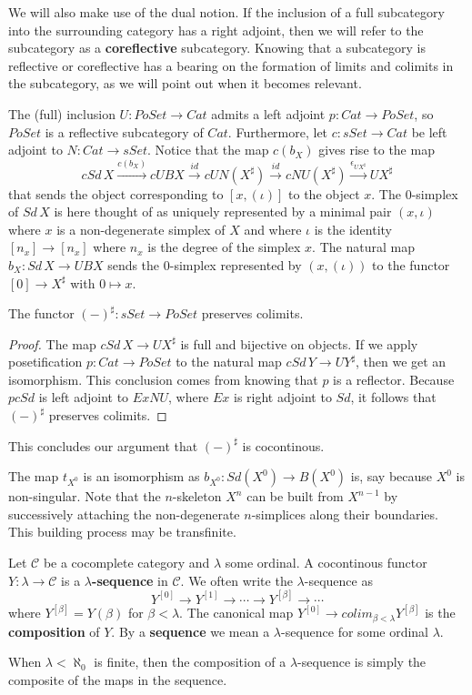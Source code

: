 We will also make use of the dual notion. If the inclusion of a full subcategory into the surrounding category has a right adjoint, then we will refer to the subcategory as a \textbf{coreflective} subcategory. Knowing that a subcategory is reflective or coreflective has a bearing on the formation of limits and colimits in the subcategory, as we will point out when it becomes relevant.

The (full) inclusion $U:PoSet\to Cat$ admits a left adjoint $p:Cat\to PoSet$, so $PoSet$ is a reflective subcategory of $Cat$. Furthermore, let $c:sSet\to Cat$ be left adjoint to $N:Cat\to sSet$. Notice that the map $c(b_X)$ gives rise to the map
\[cSd\, X\xrightarrow{c(b_X)} cUBX\xrightarrow{id} cUN(X^\sharp )\xrightarrow{id} cNU(X^\sharp )\xrightarrow{\epsilon _{UX^\sharp }} UX^\sharp\]
that sends the object corresponding to $[x,(\iota )]$ to the object $x$. The $0$-simplex of $Sd\, X$ is here thought of as uniquely represented by a minimal pair $(x,\iota )$ where $x$ is a non-degenerate simplex of $X$ and where $\iota$ is the identity $[n_x]\to [n_x]$ where $n_x$ is the degree of the simplex $x$. The natural map $b_X:Sd\, X\to UBX$ sends the $0$-simplex represented by $(x,(\iota ))$ to the functor $[0]\to X^\sharp$ with $0\mapsto x$.
\begin{lemma}\label{lem:sharp_functor_preserves_colimits}
The functor $(-)^\sharp :sSet\to PoSet$ preserves colimits.
\end{lemma}
\begin{proof}
The map $cSd\, X\to UX^\sharp$ is full and bijective on objects. If we apply posetification $p:Cat\to PoSet$ to the natural map $cSd\, Y\to UY^\sharp$, then we get an isomorphism. This conclusion comes from knowing that $p$ is a reflector. Because $pcSd$ is left adjoint to $ExNU$, where $Ex$ is right adjoint to $Sd$, it follows that $(-)^\sharp$ preserves colimits.
\end{proof}
\noindent This concludes our argument that $(-)^\sharp$ is cocontinous.

The map $t_{X^0}$ is an isomorphism as $b_{X^0}:Sd(X^0)\to B(X^0)$ is, say because $X^0$ is non-singular. Note that the $n$-skeleton $X^n$ can be built from $X^{n-1}$ by successively attaching the non-degenerate $n$-simplices along their boundaries. This building process may be transfinite.
\begin{definition}\label{def:sequence_optriang}
Let $\mathscr{C}$ be a cocomplete category and $\lambda$ some ordinal. A cocontinous functor $Y:\lambda \to \mathscr{C}$ is a \textbf{$\lambda$-sequence} in $\mathscr{C}$. We often write the $\lambda$-sequence as
\[Y^{[0]}\to Y^{[1]}\to \cdots \to Y^{[\beta ]}\to \cdots \]
where $Y^{[\beta ]}=Y(\beta )$ for $\beta <\lambda$. The canonical map $Y^{[0]}\to colim_{\beta <\lambda }Y^{[\beta ]}$ is the \textbf{composition} of $Y$. By a \textbf{sequence} we mean a $\lambda$-sequence for some ordinal $\lambda$.
\end{definition}
\noindent When $\lambda <\aleph _0$ is finite, then the composition of a $\lambda$-sequence is simply the composite of the maps in the sequence.


